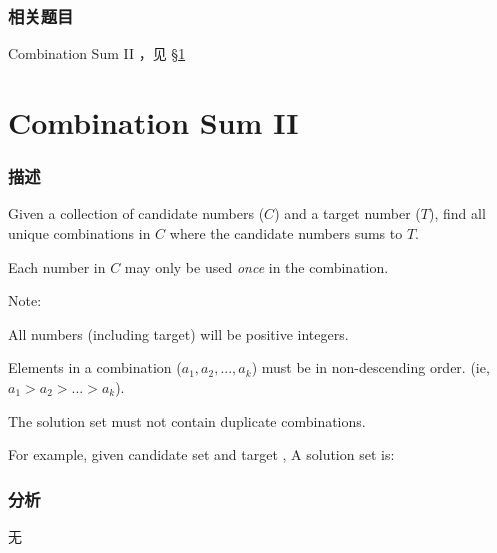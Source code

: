 \subsubsection{相关题目}
\begindot
\item Combination Sum II ，见 \S \ref{sec:combination-sum-ii}
\myenddot


\section{Combination Sum II} %
\label{sec:combination-sum-ii}


\subsubsection{描述}
Given a collection of candidate numbers ($C$) and a target number ($T$), find all unique combinations in $C$ where the candidate numbers sums to $T$.

Each number in $C$ may only be used \emph{once} in the combination.

Note:
\begindot
\item All numbers (including target) will be positive integers.
\item Elements in a combination ($a_1, a_2, ..., a_k$) must be in non-descending order. (ie, $a_1 > a_2 > ... > a_k$).
\item The solution set must not contain duplicate combinations.
\myenddot

For example, given candidate set  and target , 
A solution set is: 
\begin{Code}
[1, 7] 
[1, 2, 5] 
[2, 6] 
[1, 1, 6]
\end{Code}


\subsubsection{分析}
无


